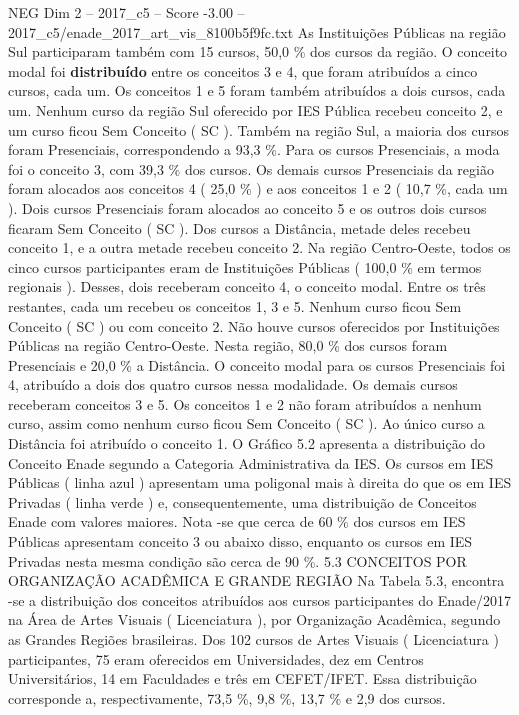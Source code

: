 \begin{textsample}{NEG Dim 2 – 2017\_c5 – Score -3.00 – 2017\_c5/enade\_2017\_art\_vis\_8100b5f9fc.txt}
As Instituições Públicas na região Sul participaram também com 15 cursos, 50,0 \% dos cursos da região.
O conceito modal foi \textbf{distribuído} entre os conceitos 3 e 4, que foram atribuídos a cinco cursos, cada um.
Os conceitos 1 e 5 foram também atribuídos a dois cursos, cada um.
Nenhum curso da região Sul oferecido por IES Pública recebeu conceito 2, e um curso ficou Sem Conceito ( SC ).
Também na região Sul, a maioria dos cursos foram Presenciais, correspondendo a 93,3 \%.
Para os cursos Presenciais, a moda foi o conceito 3, com 39,3 \% dos cursos.
Os demais cursos Presenciais da região foram alocados aos conceitos 4 ( 25,0 \% ) e aos conceitos 1 e 2 ( 10,7 \%, cada um ).
Dois cursos Presenciais foram alocados ao conceito 5 e os outros dois cursos ficaram Sem Conceito ( SC ).
Dos cursos a Distância, metade deles recebeu conceito 1, e a outra metade recebeu conceito 2.
Na região Centro-Oeste, todos os cinco cursos participantes eram de Instituições Públicas ( 100,0 \% em termos regionais ).
Desses, dois receberam conceito 4, o conceito modal.
Entre os três restantes, cada um recebeu os conceitos 1, 3 e 5.
Nenhum curso ficou Sem Conceito ( SC ) ou com conceito 2.
Não houve cursos oferecidos por Instituições Públicas na região Centro-Oeste.
Nesta região, 80,0 \% dos cursos foram Presenciais e 20,0 \% a Distância.
O conceito modal para os cursos Presenciais foi 4, atribuído a dois dos quatro cursos nessa modalidade.
Os demais cursos receberam conceitos 3 e 5.
Os conceitos 1 e 2 não foram atribuídos a nenhum curso, assim como nenhum curso ficou Sem Conceito ( SC ).
Ao único curso a Distância foi atribuído o conceito 1.
O Gráfico 5.2 apresenta a distribuição do Conceito Enade segundo a Categoria Administrativa da IES.
Os cursos em IES Públicas ( linha azul ) apresentam uma poligonal mais à direita do que os em IES Privadas ( linha verde ) e, consequentemente, uma distribuição de Conceitos Enade com valores maiores.
Nota -se que cerca de 60 \% dos cursos em IES Públicas apresentam conceito 3 ou abaixo disso, enquanto os cursos em IES Privadas nesta mesma condição são cerca de 90 \%. 5.3 CONCEITOS POR ORGANIZAÇÃO ACADÊMICA E GRANDE REGIÃO Na Tabela 5.3, encontra -se a distribuição dos conceitos atribuídos aos cursos participantes do Enade/2017 na Área de Artes Visuais ( Licenciatura ), por Organização Acadêmica, segundo as Grandes Regiões brasileiras.
Dos 102 cursos de Artes Visuais ( Licenciatura ) participantes, 75 eram oferecidos em Universidades, dez em Centros Universitários, 14 em Faculdades e três em CEFET/IFET.
Essa distribuição corresponde a, respectivamente, 73,5 \%, 9,8 \%, 13,7 \% e 2,9 dos cursos.

\end{textsample}

